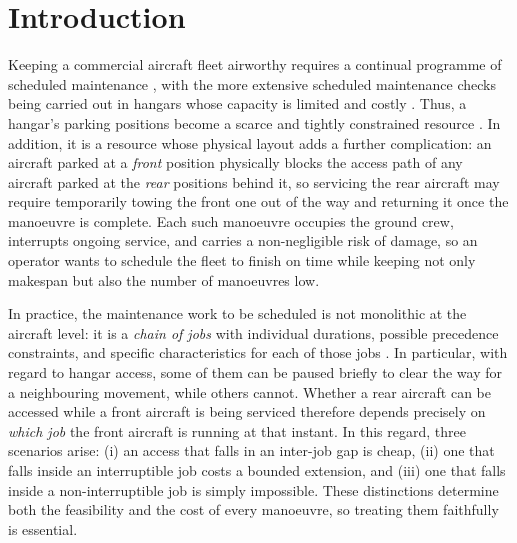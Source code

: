 \section{Introduction}
\label{sec:intro}

Keeping a commercial aircraft fleet airworthy requires a continual programme of scheduled maintenance \citep{ahmadi2010aircraft}, with the more extensive scheduled maintenance checks being carried out in hangars whose capacity is limited and costly \citep{Qin2020,WEIDE2022105667}. Thus, a hangar's parking positions become a scarce and tightly constrained resource \citep{aerospace8040113}. In addition, it is a resource whose physical layout adds a further complication: an aircraft parked at a \emph{front} position physically blocks the access path of any aircraft parked at the \emph{rear} positions behind it, so servicing the rear aircraft may require temporarily towing the front one out of the way and returning it once the manoeuvre is complete. Each such manoeuvre occupies the ground crew, interrupts ongoing service, and carries a non-negligible risk of damage, so an operator wants to schedule the fleet to finish on time while keeping not only makespan but also the number of manoeuvres low.

In practice, the maintenance work to be scheduled is not monolithic at the aircraft level: it is a \emph{chain of jobs} with individual durations, possible precedence constraints, and specific characteristics for each of those jobs \citep{junqueira2020procedure,Ohman2021}. In particular, with regard to hangar access, some of them can be paused briefly to clear the way for a neighbouring movement, while others cannot. Whether a rear aircraft can be accessed while a front aircraft is being serviced therefore depends precisely on \emph{which job} the front aircraft is running at that instant. In this regard, three scenarios arise: (i) an access that falls in an inter-job gap is cheap, (ii) one that falls inside an interruptible job costs a bounded extension, and (iii) one that falls inside a non-interruptible job is simply impossible. These distinctions determine both the feasibility and the cost of every manoeuvre, so treating them faithfully is essential.

